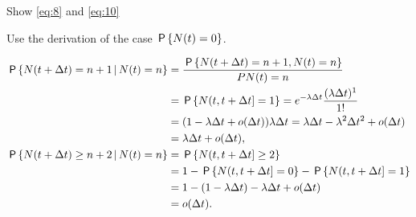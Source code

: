 \documentclass[stochastic-or.tex]{subfiles}
\begin{document}
\begin{exercise} \label{ex:p-355}
 Show \cref{eq:8} and  \cref{eq:10}
\begin{hint} Use the derivation of the case $\P{N(t)=0}$.
\end{hint}
\begin{solution}
 \begin{align*}
 \P{N(t+\Delta t) = n +1 \given N(t) = n}
&= \frac{\P{N(t+\Delta t) = n +1 , N(t) =n}}{P{N(t) = n}}\\
&= \P{N(t, t+\Delta t] = 1} = e^{-\lambda \Delta t} \frac{(\lambda \Delta t)^1}{1!} \\
&= (1-\lambda \Delta t + o(\Delta t))\lambda \Delta t = \lambda \Delta t - \lambda^2 \Delta t^2 + o(\Delta t) \\
&= \lambda \Delta t + o(\Delta t),\\
 \P{N(t+\Delta t) \geq n+2 \given N(t) = n}
&= \P{N(t, t+\Delta t] \geq 2} \\
&= 1 - \P{N(t, t+\Delta t] = 0} - \P{N(t, t+\Delta t] = 1}\\
& = 1- (1-\lambda \Delta t) - \lambda \Delta t +o(\Delta t)\\
&= o(\Delta t).
 \end{align*}
\end{solution}
\end{exercise}
\end{document}
